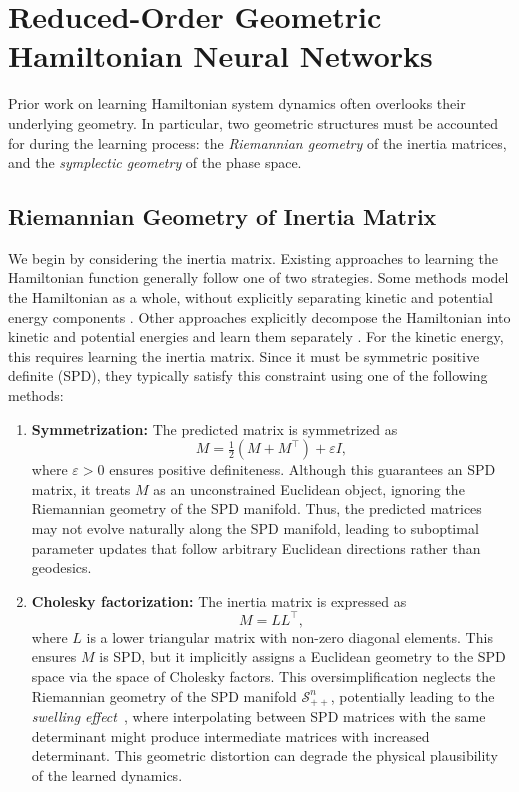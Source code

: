 \documentclass{article}
\theoremstyle{plain}
\theoremstyle{definition}
\theoremstyle{remark}
\begin{document}
\section{Reduced-Order Geometric Hamiltonian Neural Networks}
Prior work on learning Hamiltonian system dynamics often overlooks their underlying geometry. In particular, two geometric structures must be accounted for during the learning process: the \emph{Riemannian geometry} of the inertia matrices, and the \emph{symplectic geometry} of the phase space.

\subsection{Riemannian Geometry of Inertia Matrix}
We begin by considering the inertia matrix. Existing approaches to learning the Hamiltonian function generally follow one of two strategies. Some methods model the Hamiltonian as a whole, without explicitly separating kinetic and potential energy components \cite{hamiltonian_neural_networks}. Other approaches explicitly decompose the Hamiltonian into kinetic and potential energies and learn them separately \cite{zhong2024symplecticodenetlearninghamiltonian}. For the kinetic energy, this requires learning the inertia matrix. Since it must be symmetric positive definite (SPD), they typically satisfy this constraint using one of the following methods:

\begin{enumerate}
    \item \textbf{Symmetrization:} The predicted matrix is symmetrized as
    \[
        M = \tfrac{1}{2}(M + M^\top) + \varepsilon I,
    \]
    where $\varepsilon > 0$ ensures positive definiteness. Although this guarantees an SPD matrix, it treats $M$ as an unconstrained Euclidean object, ignoring the Riemannian geometry of the SPD manifold. Thus, the predicted matrices may not evolve naturally along the SPD manifold, leading to suboptimal parameter updates that follow arbitrary Euclidean directions rather than geodesics.
    
    \item \textbf{Cholesky factorization:} The inertia matrix is expressed as
    \[
        M = L L^\top,
    \]
    where $L$ is a lower triangular matrix with non-zero diagonal elements. This ensures $M$ is SPD, but it implicitly assigns a Euclidean geometry to the SPD space via the space of Cholesky factors. This oversimplification neglects the  Riemannian geometry of the SPD manifold $\mathcal{S}_{++}^n$, potentially leading to the \emph{swelling effect}~\citep{feragen2017geodesic,lin2019riemannian}, where interpolating between SPD matrices with the same determinant might produce intermediate matrices with increased determinant. This geometric distortion can degrade the physical plausibility of the learned dynamics.
\end{enumerate}
\end{document}
